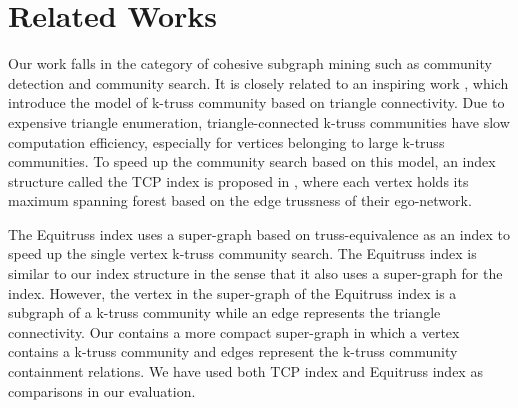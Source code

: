 \section{Related Works}
\label{relatedwork} 

Our work falls in the category of cohesive subgraph mining \cite{sozio2010community,cui2014local,bera2018maximal} such as community detection and community search. It is closely related to an inspiring work \cite{huang2014querying}, which introduce the model of k-truss community based on triangle connectivity. 
Due to expensive triangle enumeration, triangle-connected k-truss communities have slow computation efficiency, especially for vertices belonging to large k-truss communities. To speed up the community search based on this model, an index structure called the TCP index is proposed in \cite{huang2014querying}, where each vertex holds its maximum spanning forest based on the edge trussness of their ego-network. 

The Equitruss index \cite{akbas2017truss} uses a super-graph based on truss-equivalence as an index to speed up the single vertex k-truss community search.  
The Equitruss index is similar to our index structure in the sense that it also uses a super-graph for the index. However, the vertex in the super-graph of the Equitruss index is a subgraph of a k-truss community while an edge represents the triangle connectivity. Our \twolevelindex{} contains a more compact super-graph in which a vertex contains a k-truss community and edges represent the k-truss community containment relations.  We have used both TCP index and Equitruss index as comparisons in our evaluation.

